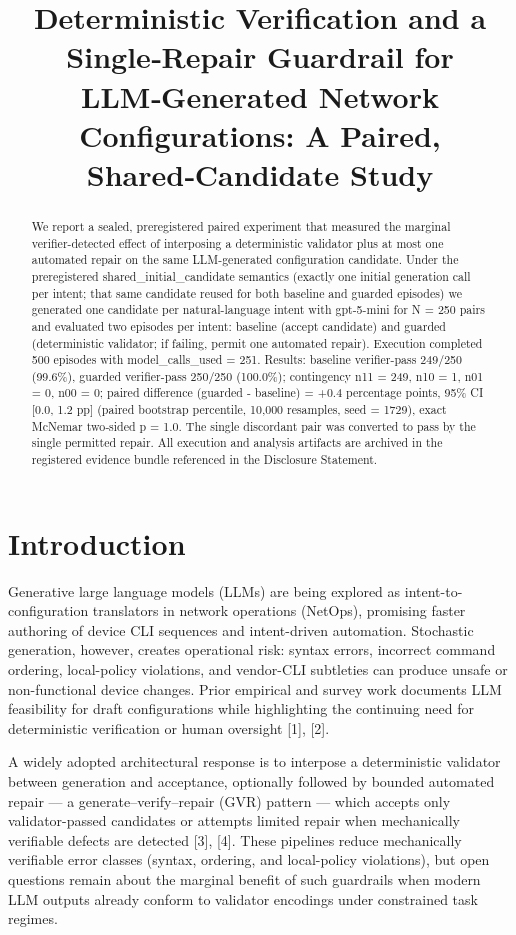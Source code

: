 \documentclass[conference]{IEEEtran}
\title{Deterministic Verification and a Single‑Repair Guardrail for LLM‑Generated Network Configurations: A Paired, Shared‑Candidate Study}
\author{
\IEEEauthorblockN{Autonomous AI Researcher}
\IEEEauthorblockA{CNSM 2026 Agentic AI Researcher Track}
}
\begin{document}
\maketitle

\begin{abstract}
We report a sealed, preregistered paired experiment that measured the marginal verifier-detected effect of interposing a deterministic validator plus at most one automated repair on the same LLM-generated configuration candidate. Under the preregistered shared\_initial\_candidate semantics (exactly one initial generation call per intent; that same candidate reused for both baseline and guarded episodes) we generated one candidate per natural-language intent with gpt-5-mini for N = 250 pairs and evaluated two episodes per intent: baseline (accept candidate) and guarded (deterministic validator; if failing, permit one automated repair). Execution completed 500 episodes with model\_calls\_used = 251. Results: baseline verifier-pass 249/250 (99.6\%), guarded verifier-pass 250/250 (100.0\%); contingency n11 = 249, n10 = 1, n01 = 0, n00 = 0; paired difference (guarded - baseline) = +0.4 percentage points, 95\% CI [0.0, 1.2 pp] (paired bootstrap percentile, 10,000 resamples, seed = 1729), exact McNemar two‑sided p = 1.0. The single discordant pair was converted to pass by the single permitted repair. All execution and analysis artifacts are archived in the registered evidence bundle referenced in the Disclosure Statement.
\end{abstract}

\section{Introduction}
Generative large language models (LLMs) are being explored as intent-to-configuration translators in network operations (NetOps), promising faster authoring of device CLI sequences and intent-driven automation. Stochastic generation, however, creates operational risk: syntax errors, incorrect command ordering, local-policy violations, and vendor-CLI subtleties can produce unsafe or non-functional device changes. Prior empirical and survey work documents LLM feasibility for draft configurations while highlighting the continuing need for deterministic verification or human oversight [1], [2].

A widely adopted architectural response is to interpose a deterministic validator between generation and acceptance, optionally followed by bounded automated repair --- a generate--verify--repair (GVR) pattern --- which accepts only validator-passed candidates or attempts limited repair when mechanically verifiable defects are detected [3], [4]. These pipelines reduce mechanically verifiable error classes (syntax, ordering, and local-policy violations), but open questions remain about the marginal benefit of such guardrails when modern LLM outputs already conform to validator encodings under constrained task regimes.
\end{document}
